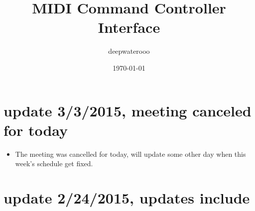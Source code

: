 \documentclass[9pt,b5paper]{article}
\author{deepwaterooo}
\date{\today}
\title{MIDI Command Controller Interface}
\begin{document}
\maketitle
\tableofcontents


\section{update 3/3/2015, meeting canceled for today}
\label{sec-1}
\begin{itemize}
\item The meeting was cancelled for today, will update some other day when this week's schedule get fixed.
\end{itemize}
\section{update 2/24/2015, updates include}
\label{sec-2}
\end{document}
